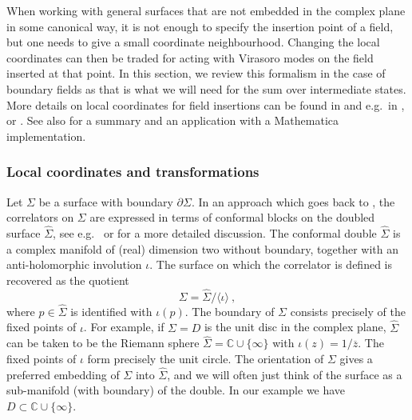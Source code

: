 \documentclass[11pt,a4paper]{article}
\numberwithin{equation}{section}
\begin{document}
When working with general surfaces that are not embedded in the complex plane in some canonical way, it is not enough to specify the insertion point of a field, but one needs to give a small coordinate neighbourhood. 
Changing the local coordinates can then be traded for acting with Virasoro modes on the field inserted at that point.
In this section, we review this formalism in the case of boundary fields as that is what we will need for the sum over intermediate states. More details on local coordinates for field insertions can be found in \cite{Gaberdiel:1994fs} and e.g.\ in \cite[Sec.\,6.3.1]{Huang:2002mx}, \cite[Sec.\,5.4]{Frenkel:2004jn} or \cite[Sec.\,5.1]{Fuchs:2004xi}. See also \cite{Brehm:2020zri} for a summary and an application with a Mathematica implementation. 

\subsubsection{Local coordinates and transformations}\label{sec:local-coord-bndfield}

Let $\Sigma$ be a surface with boundary $\partial\Sigma$. 
In an approach which goes back to \cite{Cardy:1984bb}, the correlators on $\Sigma$ are expressed in terms of conformal blocks on the doubled surface $\widehat\Sigma$, see e.g.\ \cite{Blau:1987pn} or \cite[Sec.\,6.1]{Fuchs:2004xi} for a more detailed discussion. The conformal double $\widehat\Sigma$ is a complex manifold of (real) dimension two without boundary, together with an anti-holomorphic involution $\iota$. The surface on which the correlator is defined is recovered as the quotient
\begin{equation}
	\Sigma = \widehat\Sigma / \langle \iota \rangle~,
\end{equation}
where $p \in \widehat\Sigma$ is identified with $\iota(p)$. The boundary of $\Sigma$ consists precisely of the fixed points of $\iota$. For example, if $\Sigma = D$ is the unit disc in the complex plane, $\widehat\Sigma$ can be taken to be the Riemann sphere $\widehat\Sigma = \mathbb{C} \cup \{\infty\}$ with $\iota(z)=1/\overline{z}$. The fixed points of $\iota$ form precisely the unit circle. The orientation of $\Sigma$ gives a preferred embedding of $\Sigma$ into $\widehat\Sigma$, and we will often just think of the surface as a sub-manifold (with boundary) of the double. In our example we have $D \subset \mathbb{C} \cup \{\infty\}$.
\end{document}
